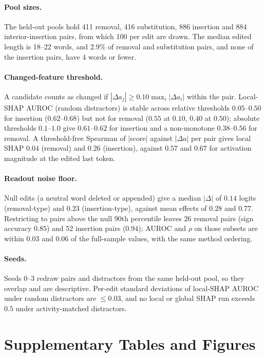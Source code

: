 \paragraph{Pool sizes.} The held-out pools hold 411 removal, 416 substitution,
886 insertion and 884 interior-insertion pairs, from which 100 per edit are drawn.
The median edited length is 18--22 words, and 2.9\% of removal and substitution
pairs, and none of the insertion pairs, have 4 words or fewer.

\paragraph{Changed-feature threshold.} A candidate counts as changed if
$|\Delta a_j|\ge 0.10\max_i|\Delta a_i|$ within the pair. Local-SHAP AUROC
(random distractors) is stable across relative thresholds $0.05$--$0.50$ for
insertion ($0.62$--$0.68$) but not for removal ($0.55$ at $0.10$, $0.40$ at
$0.50$); absolute thresholds $0.1$--$1.0$ give $0.61$--$0.62$ for insertion and a non-monotone $0.38$--$0.56$ for removal. A
threshold-free Spearman of $|$score$|$ against $|\Delta a|$ per pair gives
local SHAP $0.04$ (removal) and $0.26$ (insertion), against $0.57$ and $0.67$
for activation magnitude at the edited last token.

\paragraph{Readout noise floor.} Null edits (a neutral word deleted or
appended) give a median $|\Delta|$ of $0.14$ logits (removal-type) and $0.23$
(insertion-type), against mean effects of $0.28$ and $0.77$. Restricting to
pairs above the null 90th percentile leaves 26 removal pairs (sign accuracy
$0.85$) and 52 insertion pairs ($0.94$); AUROC and $\rho$ on those subsets are
within $0.03$ and $0.06$ of the full-sample values, with the same method ordering.

\paragraph{Seeds.} Seeds $0$--$3$ redraw pairs
and distractors from the same held-out pool, so they overlap and are descriptive.
Per-edit standard deviations of local-SHAP AUROC under random distractors are
$\le 0.03$, and no local or global SHAP run exceeds $0.5$ under activity-matched
distractors.

\clearpage
\section{Supplementary Tables and Figures}
\label{app:supptables}

